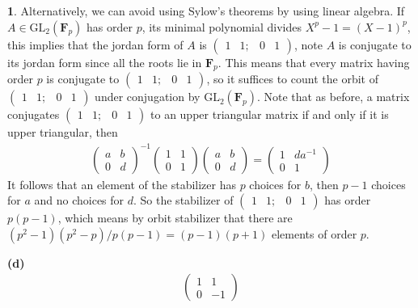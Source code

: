 \documentclass[10.5pt]{article}
\theoremstyle{definition}
\newtheorem{pb}{}
\begin{document}
\begin{pb}
        Alternatively, we can avoid using Sylow's theorems by using linear algebra. If \(A \in \text{GL}_2(\mathbf{F}_p)\) has order \(p\), its minimal polynomial divides \(X^p - 1 = (X-1)^p\), this implies that the jordan form of \(A\) is \(\begin{pmatrix} 1 & 1; & 0 & 1 \end{pmatrix}\), note \(A\) is conjugate to its jordan form since all the roots lie in \(\mathbf{F}_p\). This means that every matrix having order \(p\) is conjugate to \(\begin{pmatrix} 1 & 1; & 0 & 1 \end{pmatrix}\), so it suffices to count the orbit of \(\begin{pmatrix} 1 & 1; & 0 & 1 \end{pmatrix}\) under conjugation by \(\text{GL}_2(\mathbf{F}_p)\). Note that as before, a matrix conjugates \(\begin{pmatrix} 1 & 1; & 0 & 1 \end{pmatrix}\) to an upper triangular matrix if and only if it is upper triangular, then
        \begin{align*}
            \begin{pmatrix} a & b \\ 0 & d \end{pmatrix}^{-1}\begin{pmatrix} 1 & 1 \\ 0 & 1 \end{pmatrix} \begin{pmatrix} a & b \\ 0 & d \end{pmatrix} = \begin{pmatrix} 1 & da^{-1} \\ 0 & 1 \end{pmatrix}
        \end{align*}
        It follows that an element of the stabilizer has \(p\) choices for \(b\), then \(p-1\) choices for \(a\) and no choices for \(d\). So the stabilizer of \(\begin{pmatrix} 1 & 1; & 0 & 1 \end{pmatrix}\) has order \(p(p-1)\), which means by orbit stabilizer that there are \((p^2-1)(p^2-p)/p(p-1) = (p-1)(p+1)\) elements of order \(p\).

        \textbf{(d)}
        \begin{align*}
            \begin{pmatrix}
                1 & 1 \\ 0 & -1
            \end{pmatrix}
        \end{align*}


\end{pb}
\end{document}
